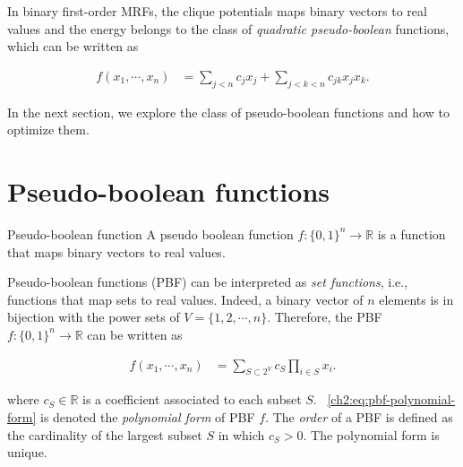 

In binary first-order MRFs, the clique potentials maps binary vectors to real values and the energy belongs to the class of \emph{quadratic pseudo-boolean} functions, which can be written as

\begin{align*}
	f(x_1,\cdots, x_n) &= \sum_{j < n}{c_jx_j} + \sum_{j<k<n}{c_{jk}x_jx_k}.
\end{align*} 

In the next section, we explore the class of pseudo-boolean functions and how to optimize them.

\section{Pseudo-boolean functions}
\label{ch2:sec:pseudo-boolean-functions}

\begin{definition}{Pseudo-boolean function}
	A pseudo boolean function $f:\{0,1\}^n \rightarrow \mathbb{R}$ is a function that maps binary vectors to real values.
\end{definition}

Pseudo-boolean functions (PBF) can be interpreted as \emph{set functions}, i.e., functions that map sets to real values. Indeed, a binary vector of $n$ elements is in bijection with the power sets of $V = \{1,2,\cdots,n\}$. Therefore, the PBF $f:\{0,1\}^n \rightarrow \mathbb{R}$ can be written as

\begin{align}
	f(x_1,\cdots,x_n) &= \sum_{S \subset 2^{V}}{c_S \prod_{i \in S}{x_i}}.
	\label{ch2:eq:pbf-polynomial-form}
\end{align}

where $c_S \in \mathbb{R}$ is a coefficient associated to each subset $S$. ~\cref{ch2:eq:pbf-polynomial-form} is denoted the \emph{polynomial form} of PBF $f$. The \emph{order} of a PBF is defined as the cardinality of the largest subset $S$ in which $c_S>0$. The polynomial form is unique. 

